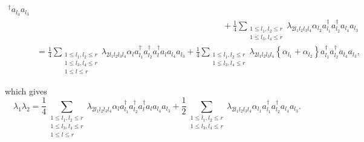 \documentclass[aps,preprint]{revtex4}%
\begin{document}
\begin{align}
{}^{\dagger}a_{l_{4}}a_{l_{3}}\nonumber\\
&  \qquad\qquad\qquad\qquad\qquad\qquad\qquad\qquad\qquad\qquad\qquad+\frac
{1}{4}\sum_{\substack{1\leq l_{1},l_{2}\leq r\\1\leq l_{3},l_{4}\leq
r}}\lambda_{2l_{1}l_{2}l_{3}l_{4}}\alpha_{l_{2}}a_{l_{1}}^{\dagger}a_{l_{2}%
}^{\dagger}a_{l_{4}}a_{l_{3}}\nonumber\\
&  =\frac{1}{4}\sum_{\substack{1\leq l_{1},l_{2}\leq r\\1\leq l_{3},l_{4}\leq
r\\1\leq l\leq r}}\lambda_{2l_{1}l_{2}l_{3}l_{4}}\alpha_{l}a_{l_{1}}^{\dagger
}a_{l_{2}}^{\dagger}a_{l}^{\dagger}a_{l}a_{l_{4}}a_{l_{3}}+\frac{1}{4}%
\sum_{\substack{1\leq l_{1},l_{2}\leq r\\1\leq l_{3},l_{4}\leq r}%
}\lambda_{2l_{1}l_{2}l_{3}l_{4}}\left\{  \alpha_{l_{1}}+\alpha_{l_{2}%
}\right\}  a_{l_{1}}^{\dagger}a_{l_{2}}^{\dagger}a_{l_{4}}a_{l_{3}},
\end{align}


\bigskip which gives
\begin{equation}
\lambda_{1}\lambda_{2}=\frac{1}{4}\sum_{\substack{1\leq l_{1},l_{2}\leq
r\\1\leq l_{3},l_{4}\leq r\\1\leq l\leq r}}\lambda_{2l_{1}l_{2}l_{3}l_{4}%
}\alpha_{l}a_{l_{1}}^{\dagger}a_{l_{2}}^{\dagger}a_{l}^{\dagger}a_{l}a_{l_{4}%
}a_{l_{3}}+\frac{1}{2}\sum_{\substack{1\leq l_{1},l_{2}\leq r\\1\leq
l_{3},l_{4}\leq r}}\lambda_{2l_{1}l_{2}l_{3}l_{4}}\alpha_{l_{1}}a_{l_{1}%
}^{\dagger}a_{l_{2}}^{\dagger}a_{l_{4}}a_{l_{3}}.
\end{equation}
\end{document}
